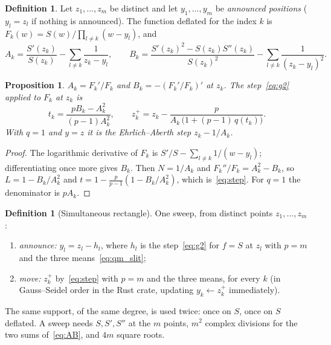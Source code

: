 \documentclass[10pt,a4paper]{article}
\newtheorem{proposition}[theorem]{Proposition}
\theoremstyle{definition}
\newtheorem{definition}[theorem]{Definition}
\numberwithin{equation}{section}
\begin{document}
\begin{definition}\label{def:defl}
Let $z_1,\dots,z_m$ be distinct and let $y_1,\dots,y_m$ be \emph{announced positions} ($y_l=z_l$ if nothing is announced). The function deflated for the index $k$ is $F_k(w)=S(w)\big/\prod_{l\ne k}(w-y_l)$, and
\begin{equation}\label{eq:AB}
 A_k=\frac{S'(z_k)}{S(z_k)}-\sum_{l\ne k}\frac1{z_k-y_l},\qquad
 B_k=\frac{S'(z_k)^2-S(z_k)S''(z_k)}{S(z_k)^2}-\sum_{l\ne k}\frac1{(z_k-y_l)^2}.
\end{equation}
\end{definition}

\begin{proposition}\label{prop:step}
$A_k=F_k'/F_k$ and $B_k=-(F_k'/F_k)'$ at $z_k$. The step~\eqref{eq:g2} applied to $F_k$ at $z_k$ is
\begin{equation}\label{eq:step}
 t_k=\frac{pB_k-A_k^2}{(p-1)A_k^2},\qquad z_k^+=z_k-\frac{p}{A_k\,\bigl(1+(p-1)\,q(t_k)\bigr)} .
\end{equation}
With $q=1$ and $y=z$ it is the Ehrlich--Aberth step $z_k-1/A_k$.
\end{proposition}
\begin{proof}
The logarithmic derivative of $F_k$ is $S'/S-\sum_{l\ne k}1/(w-y_l)$; differentiating once more gives $B_k$. Then $N=1/A_k$ and $F_k''/F_k=A_k^2-B_k$, so $L=1-B_k/A_k^2$ and $t=1-\frac{p}{p-1}(1-B_k/A_k^2)$, which is~\eqref{eq:step}. For $q=1$ the denominator is $pA_k$.
\end{proof}

\begin{definition}[Simultaneous rectangle]\label{def:sweep}
One sweep, from distinct points $z_1,\dots,z_m$:
\begin{enumerate}
\item \emph{announce:} $y_l=z_l-h_l$, where $h_l$ is the step~\eqref{eq:g2} for $f=S$ at $z_l$ with $p=m$ and the three means~\eqref{eq:qm_slit};
\item \emph{move:} $z_k^+$ by~\eqref{eq:step} with $p=m$ and the three means, for every $k$ (in Gauss--Seidel order in the Rust crate, updating $y_k\leftarrow z_k^+$ immediately).
\end{enumerate}
\end{definition}
The same support, of the same degree, is used twice: once on $S$, once on $S$ deflated. A sweep needs $S,S',S''$ at the $m$ points, $m^2$ complex divisions for the two sums of~\eqref{eq:AB}, and $4m$ square roots.
\end{document}
